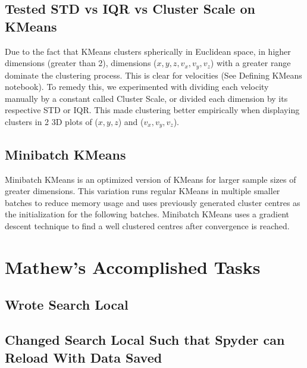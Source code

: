 \documentclass[12pt]{article}
\begin{document}
\subsection{Tested STD vs IQR vs Cluster Scale on KMeans}
Due to the fact that KMeans clusters spherically in Euclidean space, in higher dimensions (greater than 2), dimensions ($x, y, z, v_x, v_y, v_z$) with a greater range dominate the clustering process. This is clear for velocities (See Defining KMeans notebook). To remedy this, we experimented with dividing each velocity manually by a constant called Cluster Scale, or divided each dimension by its respective STD or IQR. This made clustering better empirically when displaying clusters in 2 3D plots of ($x, y, z$) and ($v_x, v_y, v_z$).
\subsection{Minibatch KMeans}
Minibatch KMeans is an optimized version of KMeans for larger sample sizes of greater dimensions. This variation runs regular KMeans in multiple smaller batches to reduce memory usage and uses previously generated cluster centres as the initialization for the following batches. Minibatch KMeans uses a gradient descent technique to find a well clustered centres after convergence is reached.
\section{Mathew's Accomplished Tasks}
\subsection{Wrote Search Local}
\subsection{Changed Search Local Such that Spyder can Reload With Data Saved}
\end{document}

